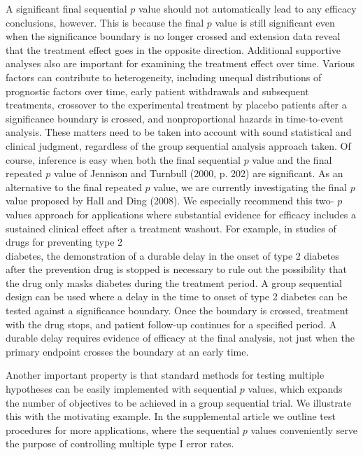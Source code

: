 \documentclass[10pt]{article}
\begin{document}
A significant final sequential $p$ value should not automatically lead to any efficacy conclusions, however. This is because the final $p$ value is still significant even when the significance boundary is no longer crossed and extension data reveal that the treatment effect goes in the opposite direction. Additional supportive analyses also are important for examining the treatment effect over time. Various factors can contribute to heterogeneity, including unequal distributions of prognostic factors over time, early patient withdrawals and subsequent treatments, crossover to the experimental treatment by placebo patients after a significance boundary is crossed, and nonproportional hazards in time-to-event analysis. These matters need to be taken into account with sound statistical and clinical judgment, regardless of the group sequential analysis approach taken. Of course, inference is easy when both the final sequential $p$ value and the final repeated $p$ value of Jennison and Turnbull (2000, p. 202) are significant. As an alternative to the final repeated $p$ value, we are currently investigating the final $p$ value proposed by Hall and Ding (2008). We especially recommend this two- $p$ values approach for applications where substantial evidence for efficacy includes a sustained clinical effect after a treatment washout. For example, in studies of drugs for preventing type 2\\
diabetes, the demonstration of a durable delay in the onset of type 2 diabetes after the prevention drug is stopped is necessary to rule out the possibility that the drug only masks diabetes during the treatment period. A group sequential design can be used where a delay in the time to onset of type 2 diabetes can be tested against a significance boundary. Once the boundary is crossed, treatment with the drug stops, and patient follow-up continues for a specified period. A durable delay requires evidence of efficacy at the final analysis, not just when the primary endpoint crosses the boundary at an early time.

Another important property is that standard methods for testing multiple hypotheses can be easily implemented with sequential $p$ values, which expands the number of objectives to be achieved in a group sequential trial. We illustrate this with the motivating example. In the supplemental article we outline test procedures for more applications, where the sequential $p$ values conveniently serve the purpose of controlling multiple type I error rates.
\end{document}
